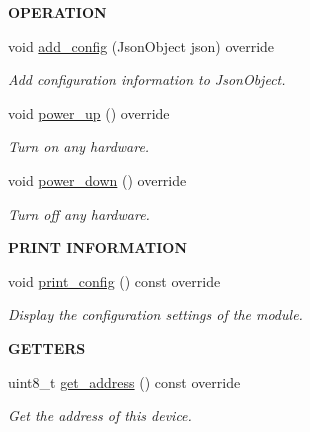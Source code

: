 \begin{Indent}{\bf O\+P\+E\+R\+A\+T\+I\+ON}\par
\begin{DoxyCompactItemize}
\item 
void \hyperlink{class_loom___lo_ra_a0f70fbbfe83db6ab5bc70d5b73e1df5a}{add\+\_\+config} (Json\+Object json) override
\begin{DoxyCompactList}\small\item\em Add configuration information to Json\+Object. \end{DoxyCompactList}\item 
void \hyperlink{class_loom___lo_ra_ad94dccb488e41df1492129c81d480ae4}{power\+\_\+up} () override
\begin{DoxyCompactList}\small\item\em Turn on any hardware. \end{DoxyCompactList}\item 
void \hyperlink{class_loom___lo_ra_a28c3103ea9024475f152e7585cc462df}{power\+\_\+down} () override
\begin{DoxyCompactList}\small\item\em Turn off any hardware. \end{DoxyCompactList}\end{DoxyCompactItemize}
\end{Indent}
\begin{Indent}{\bf P\+R\+I\+NT I\+N\+F\+O\+R\+M\+A\+T\+I\+ON}\par
\begin{DoxyCompactItemize}
\item 
void \hyperlink{class_loom___lo_ra_a2d73e0aa394de9db046621c86ea644c0}{print\+\_\+config} () const override
\begin{DoxyCompactList}\small\item\em Display the configuration settings of the module. \end{DoxyCompactList}\end{DoxyCompactItemize}
\end{Indent}
\begin{Indent}{\bf G\+E\+T\+T\+E\+RS}\par
\begin{DoxyCompactItemize}
\item 
uint8\+\_\+t \hyperlink{class_loom___lo_ra_acbb8f093b6c0ed07ca5816cfc4b75175}{get\+\_\+address} () const override
\begin{DoxyCompactList}\small\item\em Get the address of this device. \end{DoxyCompactList}\end{DoxyCompactItemize}
\end{Indent}

